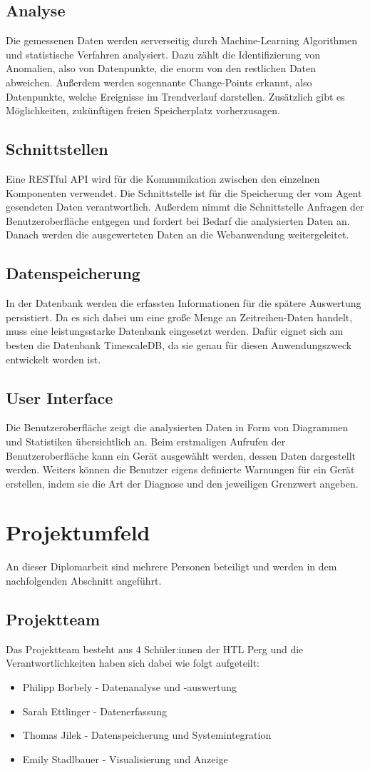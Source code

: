 \documentclass{report}
\begin{document}
\subsection{Analyse} 
Die gemessenen Daten werden serverseitig durch Machine-Learning Algorithmen und statistische Verfahren analysiert. Dazu zählt die Identifizierung von Anomalien, also von Datenpunkte, die enorm von den restlichen Daten abweichen. Außerdem werden sogennante Change-Points erkannt, also Datenpunkte, welche Ereignisse im Trendverlauf darstellen. Zusätzlich gibt es Möglichkeiten, zukünftigen freien Speicherplatz vorherzusagen.
\subsection{Schnittstellen}
Eine RESTful API wird für die Kommunikation zwischen den einzelnen Komponenten verwendet. Die Schnittstelle ist für die Speicherung der vom Agent gesendeten Daten verantwortlich. Außerdem nimmt die Schnittstelle Anfragen der Benutzeroberfläche entgegen und fordert bei Bedarf die analysierten Daten an. Danach werden die ausgewerteten Daten an die Webanwendung weitergeleitet.  
\subsection{Datenspeicherung} 
In der Datenbank werden die erfassten Informationen für die spätere Auswertung persistiert. Da es sich dabei um eine große Menge an Zeitreihen-Daten handelt, muss eine leistungsstarke Datenbank eingesetzt werden. Dafür eignet sich am besten die Datenbank TimescaleDB, da sie genau für diesen Anwendungszweck entwickelt worden ist.
\subsection{User Interface}
Die Benutzeroberfläche zeigt die analysierten Daten in Form von Diagrammen und Statistiken übersichtlich an. Beim erstmaligen Aufrufen der Benutzeroberfläche kann ein Gerät ausgewählt werden, dessen Daten dargestellt werden. Weiters können die Benutzer eigens definierte Warnungen für ein Gerät erstellen, indem sie die Art der Diagnose und den jeweiligen Grenzwert angeben.
\section{Projektumfeld}
An dieser Diplomarbeit sind mehrere Personen beteiligt und werden in dem nachfolgenden Abschnitt angeführt.
\subsection{Projektteam}
Das Projektteam besteht aus 4 Schüler:innen der HTL Perg und die Verantwortlichkeiten haben sich dabei wie folgt aufgeteilt:
\begin{itemize}
    \item Philipp Borbely - Datenanalyse und -auswertung
    \item Sarah Ettlinger - Datenerfassung
    \item Thomas Jilek - Datenspeicherung und Systemintegration
    \item Emily Stadlbauer - Visualisierung und Anzeige
\end{itemize}
\end{document}
